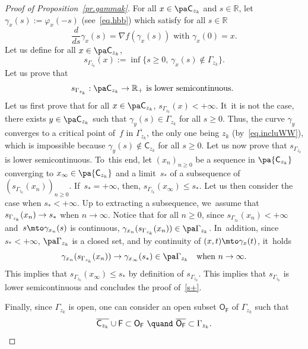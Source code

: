 \begin{proof}[Proof of Proposition~\ref{pr.gammak}]
For all $x\in \pa \mathsf C_{z_k}$ and $s\in \mathbb R$, let $\gamma_x(s):=\varphi_x(-s)$ (see~\eqref{eq.hbb}) which satisfy for all $s\in \mathbb R$
\begin{equation}\label{eq.hbb2}
\frac{d}{ds}\gamma_x(s)=\nabla f(\gamma_x(s)) \text{ with } \gamma_x(0)=x.
\end{equation}
Let us define
for all $x\in \pa \mathsf C_{z_k}$,
\begin{equation}\label{eq.des+}
s_{\Gamma_{z_k}}(x):=\inf\{s\ge 0, \, \gamma_x(s) \notin {\Gamma_{z_k}} \}.
\end{equation}
Let us prove that
\begin{equation}\label{s+}
s_{\Gamma_{z_k}}: \pa \mathsf C_{z_k}\to \mathbb R_+ \text{ is lower semicontinuous. }
\end{equation}
Let us first prove that for all $x\in \pa \mathsf C_{z_k}$, $ s_{\Gamma_{z_k}}(x)<+\infty$. It~it is not the case, there exists $y\in \pa \mathsf C_{z_k}$ such that $\gamma_y(s)\in \Gamma_{z_k}$ for all $s\ge 0$. Thus, the curve $\gamma_y$ converges to a critical point of~$f$ in $\overline{\Gamma_{z_k}}$, the only one being $z_k$ (by~\eqref{eq.incluWW}), which is impossible because $\gamma_y(s)\notin \mathsf C_{z_k}$ for all $s\ge 0$. Let us now prove that $ s_{\Gamma_{z_k}}$ is lower semicontinuous. To~this end, let $(x_n)_{n\ge 0}$ be a sequence in $ \pa { \mathsf C_{z_k}}$ converging to $x_{\infty}\in \pa { \mathsf C_{z_k}}$ and a limit~$s_*$ of a subsequence of $(s_{\Gamma_{z_k}}(x_n))_{n\ge 0}$. If~$s_*=+\infty$, then, $ s_{\Gamma_{z_k}}(x_{\infty})\le s_*$. Let us then consider the case when $s_*<+\infty$. Up to extracting a subsequence, we~assume that $ s_{\Gamma_{z_k}}(x_n)\to\nobreak s_*$ when $n\to \infty$. Notice that for all $n\ge 0$, since $ s_{\Gamma_{z_k}}(x_n)<+\infty$ and~$s\mto \gamma_{x_n}(s)$ is continuous,
$\gamma_{x_n}(s_{\Gamma_{z_k}}(x_n))\in \pa \Gamma_{z_k}$. In~addition, since $s_*<+\infty$,
$\pa \Gamma_{z_k}$ is a closed set, and by continuity of $(x,t)\mto \gamma_x(t)$, it~holds
\[
\gamma_{x_n}(s_{\Gamma_{z_k}}(x_n))\to \gamma_{x_{\infty}}(s_*)\in \pa \Gamma_{z_k}\quad \text{when }n\to \infty.
\]
This implies that $ s_{\Gamma_{z_k}}(x_{\infty})\le s_*$ by definition of $ s_{\Gamma_{z_k}}$. This implies that $ s_{\Gamma_{z_k}}$ is lower semicontinuous and concludes the proof of~\eqref{s+}.

Finally, since $\Gamma_{z_k}$ is open, one can consider an open subset $\mathsf O_{\mathsf F}$ of $\Gamma_{z_k}$ such that
\[
\overline{ \mathsf C_{z_k} }\cup \mathsf F\subset \mathsf O_{\mathsf F} \ \quand \ \overline{\mathsf O_{\mathsf F}}\subset \Gamma_{z_k}.
\]

\end{proof}
